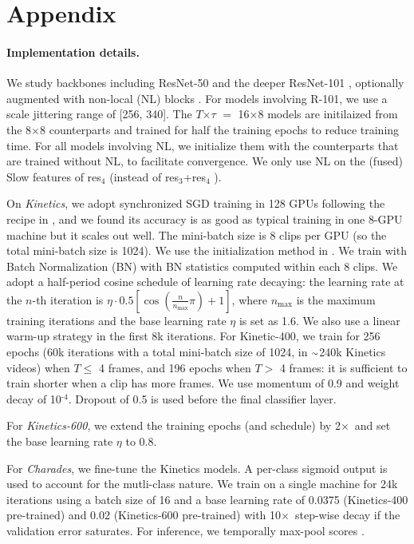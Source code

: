 \documentclass[10pt,twocolumn,letterpaper]{article}
\newcommand{\app}{\raise.17ex\hbox{$\scriptstyle\sim$}}
\def\x{$\times$}
\begin{document}
	\appendix
	\section{Appendix} \label{sec:appendix}
\vspace{-.3em}
\paragraph{Implementation details.}
	We study backbones including ResNet-50 and the deeper ResNet-101 \cite{He2016}, optionally augmented with non-local (NL) blocks \cite{Wang2018}. For models involving R-101, we use a scale jittering range of [256, 340]. The $T$\x$\tau$  $=$ 16\x8 models are initilaized from the 8\x8 counterparts and trained for half the training epochs to reduce training time. For all models involving NL, we initialize them with the counterparts that are trained without NL, to facilitate convergence. We only use NL on the (fused) Slow features of res$_4$ (instead of res$_3$+res$_4$ \cite{Wang2018}). 

On \emph{Kinetics}, we adopt synchronized SGD training in 128 GPUs following the recipe in \cite{Goyal2017}, and we found its accuracy is as good as typical training in one 8-GPU machine but it scales out well. 
	The mini-batch size is 8 clips per GPU (so the total mini-batch size is 1024).
We use the initialization method in \cite{He2015}.
	We train with Batch Normalization (BN) \cite{Ioffe2015} with BN statistics computed within each 8 clips.
	We adopt a half-period cosine schedule \cite{Loshchilov2016} of learning rate decaying: the learning rate at the $n$-th iteration is $\eta\cdot0.5[\cos(\frac{n}{n_\text{max}}\pi)+1]$, where $n_\text{max}$ is the maximum training iterations and the base learning rate $\eta$ is set as 1.6.
	We also use a linear warm-up strategy \cite{Goyal2017} in the first 8k iterations.
For Kinetic-400, we train for 256 epochs (60k iterations with a total mini-batch size of 1024, in $\app$240k Kinetics videos) when $T\leq$ 4 frames, and 196 epochs when $T>$ 4 frames: it is sufficient to train shorter when a clip has more frames.
	We use momentum of 0.9 and weight decay of 10$^\text{-4}$. Dropout \cite{Hinton2012b} of 0.5 is used before the final classifier layer.
 
 	For \emph{Kinetics-600}, we extend the training epochs (and schedule) by 2\x~and set the base learning rate $\eta$ to 0.8.

 	For \emph{Charades}, we fine-tune the Kinetics models. A per-class sigmoid output is used to account for the mutli-class nature. We train on a single machine for 24k iterations using a batch size of 16 and a base learning rate of 0.0375 (Kinetics-400 pre-trained) and 0.02 (Kinetics-600  pre-trained) with 10\x~step-wise decay if the validation error saturates. For inference, we temporally max-pool scores \cite{Wang2018}. %

	{
		\small
		
%		
		
	}

	
\end{document}
